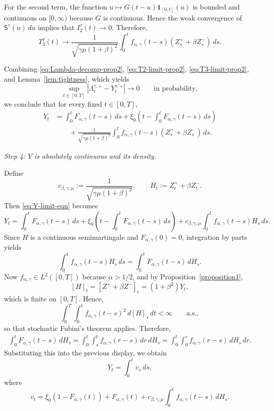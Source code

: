 \documentclass[letterpaper]{article}
\numberwithin{equation}{section}
\theoremstyle{definition}
\theoremstyle{remark}
\begin{document}
For the second term, the function
$u\mapsto G(t-u)\mathbf 1_{[0,t]}(u)$
is bounded and continuous on $[0,\infty)$ because $G$ is continuous. Hence the weak
convergence of $\mathsf S^\tau(u)\,du$ implies that
$I_2^\tau(t)\to0$.
Therefore,
\begin{equation}\label{eq:T3-limit-prop2}
  T_3^\tau(t)
  \to
  \frac1{\sqrt{\gamma\mu(1+\beta)^2}}
  \int_0^t
  f_{\alpha,\gamma}(t-s)\left(Z_s^++\beta Z_s^-\right)\,ds.
\end{equation}

Combining \eqref{eq:Lambda-decomp-prop2}, \eqref{eq:T2-limit-prop2},
\eqref{eq:T3-limit-prop2}, and Lemma~\ref{lem:tightness}, which yields
\[
  \sup_{t\in[0,T]}|\Lambda_t^{\tau,+}-Y_t^{\tau,+}|\to0
  \qquad\text{in probability},
\]
we conclude that for every fixed $t\in[0,T]$,
\begin{equation}\label{eq:Y-limit-eqn}
\begin{aligned}
  Y_t
  &=
  \int_0^t F_{\alpha,\gamma}(t-s)\,ds
  +
  \xi_0\left(
    t-\int_0^t F_{\alpha,\gamma}(t-s)\,ds
  \right)
  \\
  &\qquad
  +
  \frac1{\sqrt{\gamma\mu(1+\beta)^2}}
  \int_0^t
  f_{\alpha,\gamma}(t-s)\left(Z_s^++\beta Z_s^-\right)\,ds.
\end{aligned}
\end{equation}

\medskip
\noindent
\textit{Step 4: $Y$ is absolutely continuous and its density.}

Define
\[
  c_{\beta,\gamma,\mu}:=\frac1{\sqrt{\gamma\mu(1+\beta)^2}},
  \qquad
  H_t:=Z_t^++\beta Z_t^-.
\]
Then \eqref{eq:Y-limit-eqn} becomes
\[
  Y_t
  =
  \int_0^t F_{\alpha,\gamma}(t-s)\,ds
  +
  \xi_0\left(
    t-\int_0^t F_{\alpha,\gamma}(t-s)\,ds
  \right)
  +
  c_{\beta,\gamma,\mu}\int_0^t f_{\alpha,\gamma}(t-s)H_s\,ds.
\]
Since $H$ is a continuous semimartingale and $F_{\alpha,\gamma}(0)=0$,
integration by parts yields
\[
  \int_0^t f_{\alpha,\gamma}(t-s)H_s\,ds
  =
  \int_0^t F_{\alpha,\gamma}(t-s)\,dH_s.
\]
Now $f_{\alpha,\gamma}\in L^2([0,T])$ because $\alpha>1/2$, and by
Proposition~\ref{proposition1},
\[
  [H]_t=[Z^++\beta Z^-]_t=(1+\beta^2)Y_t,
\]
which is finite on $[0,T]$. Hence,
\[
  \int_0^T\int_0^t f_{\alpha,\gamma}(t-s)^2\,d[H]_s\,dt<\infty
  \qquad\text{a.s.},
\]
so that stochastic Fubini's theorem applies. Therefore,
\begin{align*}
  \int_0^t F_{\alpha,\gamma}(t-s)\,dH_s
  =
  \int_0^t\int_s^t f_{\alpha,\gamma}(r-s)\,dr\,dH_s
 =
  \int_0^t\int_0^r f_{\alpha,\gamma}(r-s)\,dH_s\,dr.
\end{align*}
Substituting this into the previous display, we obtain
\[
  Y_t=\int_0^t v_s\,ds,
\]
where
\begin{equation}\label{eq:v-density-pre}
  v_t
  =
  \xi_0\left(1-F_{\alpha,\gamma}(t)\right)
  +
  F_{\alpha,\gamma}(t)
  +
  c_{\beta,\gamma,\mu}
  \int_0^t
  f_{\alpha,\gamma}(t-s)\,dH_s.
\end{equation}
\end{document}
